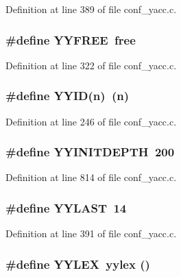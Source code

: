 Definition at line 389 of file conf\_\-yacc.c.
\subsubsection[{YYFREE}]{\setlength{\rightskip}{0pt plus 5cm}\#define YYFREE~free}\label{conf__yacc_8c_c8adfd73c006c1926f387feb1eced3ca}




Definition at line 322 of file conf\_\-yacc.c.
\subsubsection[{YYID}]{\setlength{\rightskip}{0pt plus 5cm}\#define YYID(n)~(n)}\label{conf__yacc_8c_0a6ff515042340dd341cf6ca8dd05f2d}




Definition at line 246 of file conf\_\-yacc.c.
\subsubsection[{YYINITDEPTH}]{\setlength{\rightskip}{0pt plus 5cm}\#define YYINITDEPTH~200}\label{conf__yacc_8c_eb1508a3a38ec5d64c27e8eca25330b5}




Definition at line 814 of file conf\_\-yacc.c.
\subsubsection[{YYLAST}]{\setlength{\rightskip}{0pt plus 5cm}\#define YYLAST~14}\label{conf__yacc_8c_e67923760a28e3b7ed3aa2cfaef7f9a2}




Definition at line 391 of file conf\_\-yacc.c.
\subsubsection[{YYLEX}]{\setlength{\rightskip}{0pt plus 5cm}\#define YYLEX~yylex ()}\label{conf__yacc_8c_0ea34e09602d1ede033f16ba669ef24b}




